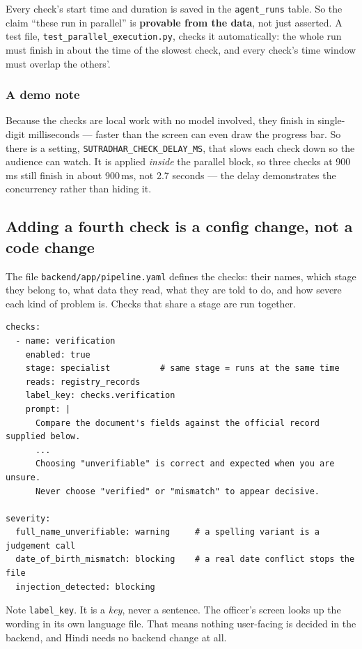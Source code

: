 \documentclass[11pt,a4paper]{article}
\begin{document}
Every check's start time and duration is saved in the \texttt{agent\_runs}
table. So the claim ``these run in parallel'' is \textbf{provable from the
data}, not just asserted. A test file, \texttt{test\_parallel\_execution.py},
checks it automatically: the whole run must finish in about the time of the
slowest check, and every check's time window must overlap the others'.

\subsubsection*{A demo note}

Because the checks are local work with no model involved, they finish in single-
digit milliseconds --- faster than the screen can even draw the progress bar. So
there is a setting, \texttt{SUTRADHAR\_CHECK\_}\allowbreak\texttt{DELAY\_MS}, that slows each check
down so the audience can watch. It is applied \emph{inside} the parallel block,
so three checks at 900\,ms still finish in about 900\,ms, not 2.7 seconds ---
the delay demonstrates the concurrency rather than hiding it.

\subsection{Adding a fourth check is a config change, not a code change}

The file \texttt{backend/app/pipeline.yaml} defines the checks: their names,
which stage they belong to, what data they read, what they are told to do, and
how severe each kind of problem is. Checks that share a stage are run together.

\begin{lstlisting}
checks:
  - name: verification
    enabled: true
    stage: specialist          # same stage = runs at the same time
    reads: registry_records
    label_key: checks.verification
    prompt: |
      Compare the document's fields against the official record supplied below.
      ...
      Choosing "unverifiable" is correct and expected when you are unsure.
      Never choose "verified" or "mismatch" to appear decisive.

severity:
  full_name_unverifiable: warning     # a spelling variant is a judgement call
  date_of_birth_mismatch: blocking    # a real date conflict stops the file
  injection_detected: blocking
\end{lstlisting}

Note \texttt{label\_key}. It is a \emph{key}, never a sentence. The officer's
screen looks up the wording in its own language file. That means nothing
user-facing is decided in the backend, and Hindi needs no backend change at all.
\end{document}

